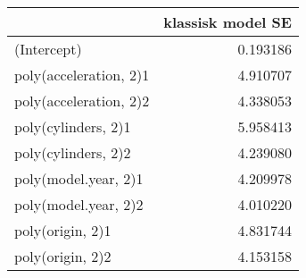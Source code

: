\begin{tabular}{lr}
\toprule
	& klassisk model SE \\
\midrule
	(Intercept) & 0.193186 \\
	poly(acceleration, 2)1 & 4.910707 \\
	poly(acceleration, 2)2 & 4.338053 \\
	poly(cylinders, 2)1 & 5.958413 \\
	poly(cylinders, 2)2 & 4.239080 \\
	poly(model.year, 2)1 & 4.209978 \\
	poly(model.year, 2)2 & 4.010220 \\
	poly(origin, 2)1 & 4.831744 \\
	poly(origin, 2)2 & 4.153158 \\
\bottomrule
\end{tabular}